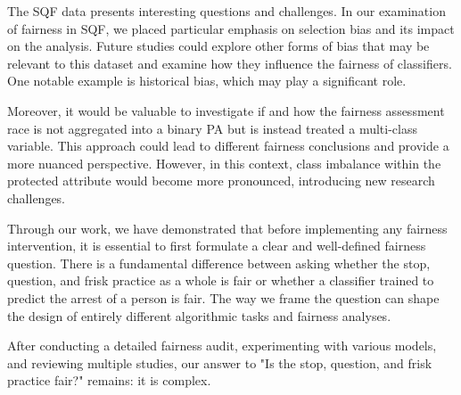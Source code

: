 

The SQF data presents interesting questions and challenges. In our examination of fairness in SQF, we placed particular emphasis on selection bias and its impact on the analysis. Future studies could explore other forms of bias that may be relevant to this dataset and examine how they influence the fairness of classifiers. One notable example is historical bias, which may play a significant role.

Moreover, it would be valuable to investigate if and how the fairness assessment race is not aggregated into a binary PA but is instead treated a multi-class variable. This approach could lead to different fairness conclusions and provide a more nuanced perspective. However, in this context, class imbalance within the protected attribute would become more pronounced, introducing new research challenges.\par
Through our work, we have demonstrated that before implementing any fairness intervention, it is essential to first formulate a clear and well-defined fairness question. There is a fundamental difference between asking whether the stop, question, and frisk practice as a whole is fair or whether a classifier trained to predict the arrest of a person is fair.
The way we frame the question can shape the design of entirely different algorithmic tasks and fairness analyses.\par
After conducting a detailed fairness audit, experimenting with various models, and reviewing multiple studies, our answer to "Is the stop, question, and frisk practice fair?" remains: it is complex.


